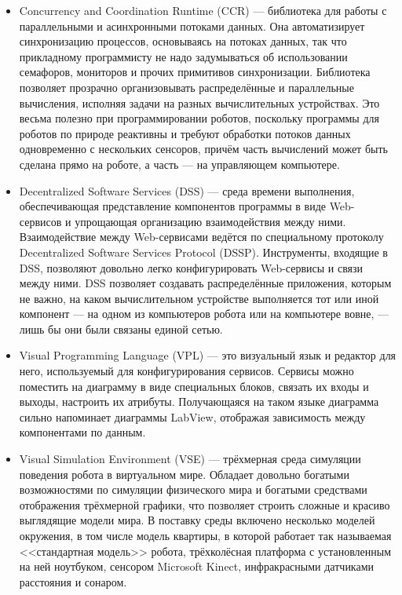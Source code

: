 \documentclass[a4paper]{article}
\begin{document}
\begin{itemize}
  \item Concurrency and Coordination Runtime (CCR) --- библиотека для работы с параллельными и асинхронными потоками данных. Она автоматизирует синхронизацию процессов, основываясь на потоках данных, так что прикладному программисту не надо задумываться об использовании семафоров, мониторов и прочих примитивов синхронизации. Библиотека позволяет прозрачно организовывать распределённые и параллельные вычисления, исполняя задачи на разных вычислительных устройствах. Это весьма полезно при программировании роботов, поскольку программы для роботов по природе реактивны и требуют обработки потоков данных одновременно с нескольких сенсоров, причём часть вычислений может быть сделана прямо на роботе, а часть --- на управляющем компьютере.
  \item Decentralized Software Services (DSS) --- среда времени выполнения, обеспечивающая представление компонентов программы в виде Web-сервисов и упрощающая организацию взаимодействия между ними. Взаимодействие между Web-сервисами ведётся по специальному протоколу Decentralized Software Services Protocol (DSSP). Инструменты, входящие в DSS, позволяют довольно легко конфигурировать Web-сервисы и связи между ними. DSS позволяет создавать распределённые приложения, которым не важно, на каком вычислительном устройстве выполняется тот или иной компонент --- на одном из компьютеров робота или на компьютере вовне, --- лишь бы они были связаны единой сетью.
  \item Visual Programming Language (VPL) --- это визуальный язык и редактор для него, используемый для конфигурирования сервисов. Сервисы можно поместить на диаграмму в виде специальных блоков, связать их входы и выходы, настроить их атрибуты. Получающаяся на таком языке диаграмма сильно напоминает диаграммы LabView, отображая зависимость между компонентами по данным.
  \item Visual Simulation Environment (VSE) --- трёхмерная среда симуляции поведения робота в виртуальном мире. Обладает довольно богатыми возможностями по симуляции физического мира и богатыми средствами отображения трёхмерной графики, что позволяет строить сложные и красиво выглядящие модели мира. В поставку среды включено несколько моделей окружения, в том числе модель квартиры, в которой работает так называемая <<стандартная модель>> робота, трёхколёсная платформа с установленным на ней ноутбуком, сенсором Microsoft Kinect\textregistered, инфракрасными датчиками расстояния и сонаром.
\end{itemize}
\end{document}
